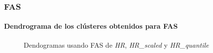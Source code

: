 \subsubsection{FAS}

\paragraph{Dendrograma de los clústeres obtenidos para FAS}

\begin{figure}[H]
    \centering
    
    \caption{Dendogramas usando FAS de \textit{HR}, \textit{HR\_scaled} y \textit{HR\_quantile}}
    \label{fig:acf_den_fc}
\end{figure}

